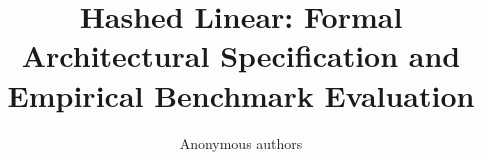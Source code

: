 \title{\textbf{Hashed Linear: Formal Architectural Specification and Empirical Benchmark Evaluation}}

\author{Anonymous authors}
